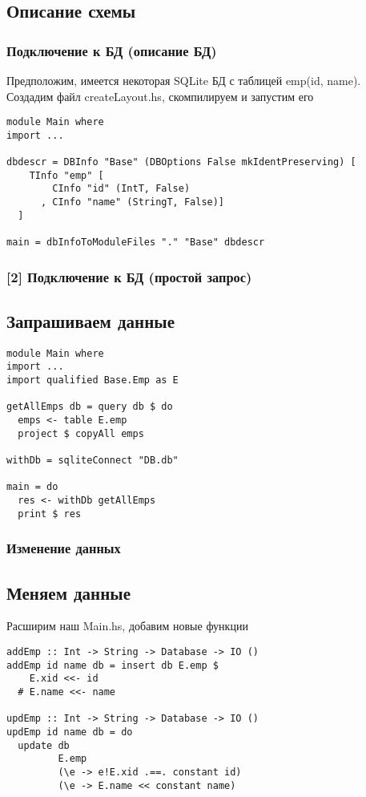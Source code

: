 \documentclass[12pt]{beamer}
\begin{document}
\subsection{Описание схемы}
\begin{frame}[fragile]
\frametitle{Подключение к БД (описание БД)}
Предположим, имеется некоторая SQLite БД с таблицей emp(id, name). Создадим файл createLayout.hs, скомпилируем и запустим его
\begin{lstlisting}
module Main where
import ...

dbdescr = DBInfo "Base" (DBOptions False mkIdentPreserving) [
    TInfo "emp" [
        CInfo "id" (IntT, False)
      , CInfo "name" (StringT, False)]
  ]

main = dbInfoToModuleFiles "." "Base" dbdescr
\end{lstlisting}
\end{frame}

\begin{frame}[fragile]
\frametitle{[2] Подключение к БД (простой запрос)}
\subsection{Запрашиваем данные}
\begin{lstlisting}
module Main where
import ...
import qualified Base.Emp as E

getAllEmps db = query db $ do
  emps <- table E.emp
  project $ copyAll emps
  
withDb = sqliteConnect "DB.db"

main = do
  res <- withDb getAllEmps
  print $ res
\end{lstlisting}
\end{frame}

\begin{frame}[fragile]
\frametitle{Изменение данных}
\subsection{Меняем данные}
Расширим наш Main.hs, добавим новые функции
\begin{lstlisting}
addEmp :: Int -> String -> Database -> IO ()
addEmp id name db = insert db E.emp $
    E.xid <<- id
  # E.name <<- name

updEmp :: Int -> String -> Database -> IO ()
updEmp id name db = do
  update db
         E.emp
         (\e -> e!E.xid .==. constant id)
         (\e -> E.name << constant name)
\end{lstlisting}
\end{frame}
\end{document}
